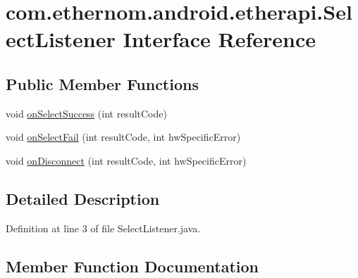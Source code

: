 \hypertarget{interfacecom_1_1ethernom_1_1android_1_1etherapi_1_1_select_listener}{}\section{com.\+ethernom.\+android.\+etherapi.\+Select\+Listener Interface Reference}
\label{interfacecom_1_1ethernom_1_1android_1_1etherapi_1_1_select_listener}
\subsection*{Public Member Functions}
\begin{DoxyCompactItemize}
\item 
void \mbox{\hyperlink{interfacecom_1_1ethernom_1_1android_1_1etherapi_1_1_select_listener_a890afbd52a51aeb70f6859d8ed26a325}{on\+Select\+Success}} (int result\+Code)
\item 
void \mbox{\hyperlink{interfacecom_1_1ethernom_1_1android_1_1etherapi_1_1_select_listener_a7ecaa3bf4d2d13db58fe1a027e2340e6}{on\+Select\+Fail}} (int result\+Code, int hw\+Specific\+Error)
\item 
void \mbox{\hyperlink{interfacecom_1_1ethernom_1_1android_1_1etherapi_1_1_select_listener_a79bddd3d84d6e92505d5f22b1567e403}{on\+Disconnect}} (int result\+Code, int hw\+Specific\+Error)
\end{DoxyCompactItemize}


\subsection{Detailed Description}


Definition at line 3 of file Select\+Listener.\+java.



\subsection{Member Function Documentation}
\mbox{\label{interfacecom_1_1ethernom_1_1android_1_1etherapi_1_1_select_listener_a79bddd3d84d6e92505d5f22b1567e403}} 
